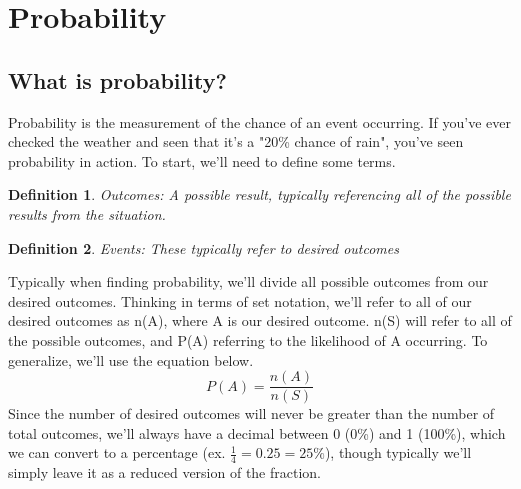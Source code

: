 \documentclass[final,1p,12pt]{elsarticle}
\newtheorem{definition}{Definition}
\begin{document}
\section{Probability}

    \subsection{What is probability?}
    Probability is the measurement of the chance of an event occurring. If you've ever checked the weather and seen that it's a "20\% chance of rain", you've seen probability in action. To start, we'll need to define some terms.
    \begin{definition}
        Outcomes: A possible result, typically referencing all of the possible results from the situation.
    \end{definition}
    \begin{definition}
        Events: These typically refer to desired outcomes
    \end{definition}
    Typically when finding probability, we'll divide all possible outcomes from our desired outcomes. Thinking in terms of set notation, we'll refer to all of our desired outcomes as n(A), where A is our desired outcome. n(S) will refer to all of the possible outcomes, and P(A) referring to the likelihood of A occurring. To generalize, we'll use the equation below.
    \begin{equation*}
        P(A) = \frac{n(A)}{n(S)}
    \end{equation*}
    Since the number of desired outcomes will never be greater than the number of total outcomes, we'll always have a decimal between 0 (0\%) and 1 (100\%), which we can convert to a percentage (ex. $\frac{1}{4}=0.25=25\%$), though typically we'll simply leave it as a reduced version of the fraction.
    
\end{document}
